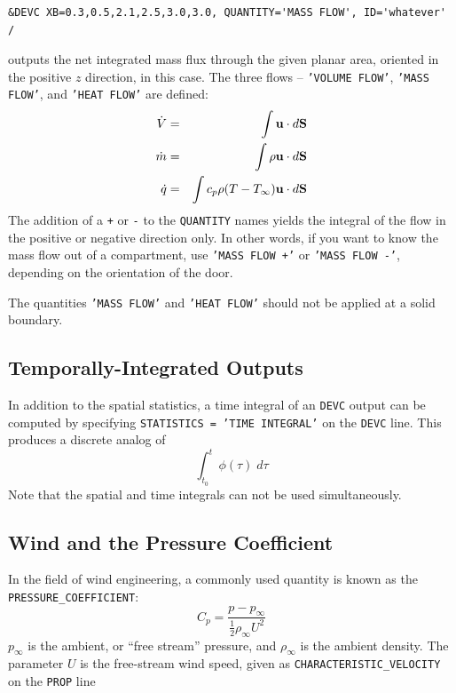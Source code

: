 \documentclass[11pt]{book}
\newcommand{\ct}{\tt\small}
\newcommand{\dS}{{d\bf S}}
\newcommand{\bu}{{\bf u}}
\newcommand{\ha}{\frac{1}{2}}
\newcommand{\be}{\begin{equation}}
\newcommand{\ee}{\end{equation}}
\begin{document}
\footnotesize
\begin{verbatim}
&DEVC XB=0.3,0.5,2.1,2.5,3.0,3.0, QUANTITY='MASS FLOW', ID='whatever' /
\end{verbatim}
\normalsize

\noindent
outputs the net integrated mass flux through the given planar area, oriented in the positive $z$ direction, in this case. The three flows -- {\ct 'VOLUME FLOW'}, {\ct 'MASS FLOW'},
and {\ct 'HEAT FLOW'} are defined:
\begin{eqnarray*} \dot{V} &=& \int \bu \cdot \dS  \\
                  \dot{m} &=& \int \rho \bu \cdot \dS \\
                  \dot{q} &=& \int c_p \rho (T-T_\infty) \bu \cdot \dS
\end{eqnarray*}
The addition of a {\ct +} or {\ct -} to the {\ct QUANTITY} names
yields the integral of the flow in the positive or negative direction
only. In other words, if you want to know the mass flow out of a
compartment, use {\ct 'MASS FLOW +'} or {\ct 'MASS FLOW -'}, depending
on the orientation of the door.

\begin{warning}
The quantities {\ct 'MASS FLOW'} and {\ct 'HEAT FLOW'} should not be applied at a solid boundary.
\end{warning}

\subsection{Temporally-Integrated Outputs}
\label{info:time_integral}

In addition to the spatial statistics, a time integral of an {\ct DEVC} output can be computed by specifying
{\ct STATISTICS = 'TIME INTEGRAL'} on the {\ct DEVC} line. This produces a discrete analog of
\be
 \int_{t_0}^t \phi(\tau) \; d\tau
\ee
Note that the spatial and time integrals can not be used simultaneously.



\subsection{Wind and the Pressure Coefficient}
\label{info:wind}

In the field of wind engineering, a commonly used quantity is known as
the {\ct PRESSURE\_COEFFICIENT}:
\be
   C_p = \frac{p-p_\infty}{\ha \rho_\infty U^2}
\ee
$p_\infty$ is the ambient, or ``free stream'' pressure, and
$\rho_\infty$ is the ambient density.  The parameter $U$ is the
free-stream wind speed, given as {\ct CHARACTERISTIC\_VELOCITY} on the
{\ct PROP} line
\end{document}
